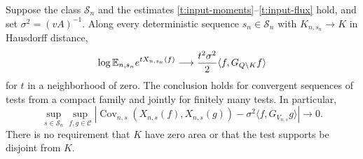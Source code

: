 \begin{theorem}
\label{t:covariance}
Suppose the class $\mathcal S_n$ and the estimates
\ref{t:input-moments}--\ref{t:input-flux} hold, and set
$\sigma^2=(vA)^{-1}$.  Along every deterministic sequence
$s_n\in\mathcal S_n$ with $K_{n,s_n}\to K$ in Hausdorff distance,
\begin{equation}\label{t:conditional-mgf}
 \log\mathbb E_{n,s_n}e^{tX_{n,s_n}(f)}
 \longrightarrow
 \frac{t^2\sigma^2}{2}\langle f,G_{Q\setminus K}f\rangle
\end{equation}
for $t$ in a neighborhood of zero.  The conclusion holds for convergent
sequences of tests from a compact family and jointly for finitely many
tests.  In particular,
\begin{equation}\label{t:uniform-covariance}
 \sup_{s\in\mathcal S_n}\sup_{f,g\in\mathcal C}
 \left|\operatorname{Cov}_{n,s}(X_{n,s}(f),X_{n,s}(g))
       -\sigma^2\langle f,G_{V_{n,s}}g\rangle\right|
 \longrightarrow0.
\end{equation}
There is no requirement that $K$ have zero area or that the test supports
be disjoint from $K$.
\end{theorem}
